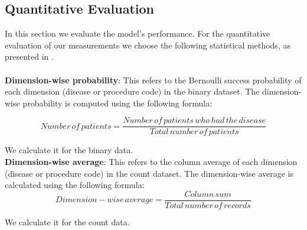 \documentclass[11pt, a4paper]{book}
\begin{document}
\subsection{Quantitative Evaluation}
In this section we evaluate the model's performance. For the quantitative evaluation of our measurements we choose the following statistical methods, as presented in \cite{Choi2017}.
\\
\\
\textbf{Dimension-wise probability}: This refers to the Bernoulli success probability of each dimension (disease or procedure code) in the binary dataset. The dimension-wise probability is computed using the following formula: 

\begin{equation}
Number\,of\,patients = \frac{Number\,of\,patients\, who \,had \,the \,disease}{Total \,number \,of \,patients}
\end{equation}

We calculate it for the binary data.
\\

\textbf{Dimension-wise average}: This refers to the column average of each dimension (disease or procedure code) in the count dataset. The dimension-wise average is calculated using the following formula: 
\begin{equation}
Dimension-wise\,average = \frac{Column \,sum}{Total \,number \,of \,records}
\end{equation}

We calculate it for the count data.
\\
\end{document}
